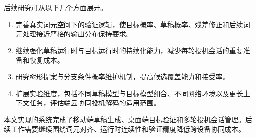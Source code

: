 后续研究可从以下几个方面展开。

\begin{enumerate}[label=\arabic*.]
  \item 完善真实词元空间下的验证逻辑，使目标概率、草稿概率、残差修正和后续词元处理接近严格的输出分布保持要求。
  \item 继续强化草稿运行时与目标运行时的持续化能力，减少每轮投机会话的重复准备和恢复成本。
  \item 研究树形提案与分支条件概率维护机制，提高候选覆盖能力和接受率。
  \item 扩展实验维度，包括不同草稿模型与目标模型组合、不同网络环境以及更长上下文任务，评估端云协同投机解码的适用范围。
\end{enumerate}

本文实现的系统完成了移动端草稿生成、桌面端目标验证和多轮投机会话管理。后续工作需要继续围绕词元对齐、运行时连续性和验证精度降低跨设备协同成本。
